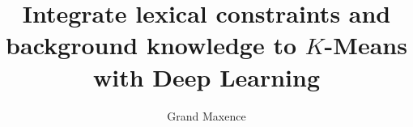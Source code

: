 \documentclass{article}       %
\begin{document}
\title{Integrate lexical constraints and background knowledge to $K$-Means with Deep Learning}
\author{Grand Maxence}

\maketitle







\nocite{*}
\printbibliography[title=References]
\end{document}
